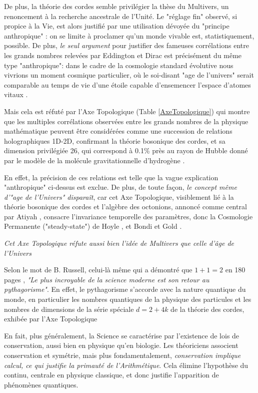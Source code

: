 \documentclass[a4paper,9pt]{article}
\begin{document}
De plus, la théorie des cordes semble privilégier la thèse du Multivers, un renoncement à la recherche ancestrale de l'Unité. Le "réglage fin" observé, si propice à la Vie, est alors justifié par une utilisation dévoyée du "principe anthropique" : on se limite à proclamer qu'un monde vivable est, statistiquement, possible. De plus, \textit{le seul argument} pour justifier des fameuses corrélations entre les grands nombres relevées par Eddington et Dirac \cite{Sanchez4} est précisément du même type "anthropique": dans le cadre de la cosmologie standard évolutive nous vivrions un moment cosmique particulier, où le soi-disant "age de l'univers" serait comparable au temps de vie d'une étoile capable d'ensemencer l'espace d'atomes vitaux \cite{Rees}.

Mais cela est réfuté par l'Axe Topologique (Table \ref{AxeTopologique}) qui montre que les multiples corrélations observées entre les grands nombres de la physique mathématique peuvent être considérées comme une succession de relations holographiques 1D-2D, confirmant la théorie bosonique des cordes, et sa dimension privilégiée 26, qui correspond à 0.1\% près au rayon de Hubble donné par le modèle de la molécule gravitationnelle d'hydrogène  \cite{Sanchez2}.


En effet, la précision de ces relations est telle que la vague explication "anthropique" ci-dessus est exclue. De plus, de toute façon, \textit{le concept même d'"age de l'Univers" disparaît}, car cet Axe Topologique, visiblement lié à la théorie bosonique des cordes et l'algèbre des octonions, annoncé comme central par Atiyah \cite{Atiyah}, consacre l'invariance temporelle des paramètres, donc la Cosmologie Permanente ("steady-state") de Hoyle \cite{Hoyle}, et Bondi et Gold \cite{Bondi2}.

\textit{Cet Axe Topologique réfute aussi bien l'idée de Multivers que celle d'âge de l'Univers}

Selon le mot de B. Russell, celui-là même qui a démontré que $1+1 = 2$ en 180 pages \cite{Russell}, \textit {"Le plus incroyable de la science moderne est son retour au pythagorisme"}\cite{Alcina}. En effet, le pythagorisme s’accorde avec la nature quantique du monde, en particulier les nombres quantiques de la physique des particules et les nombres de dimensions de la série spéciale $d = 2 + 4k$ de la théorie des cordes, exhibée par l'Axe Topologique 

En fait, plus généralement, la Science se caractérise par l'existence de lois de conservation, aussi bien en physique qu'en biologie. Les théoriciens associent conservation et symétrie, mais plus fondamentalement, \textit{conservation implique calcul, ce qui justifie la primauté de l'Arithmétique}. Cela élimine l'hypothèse du continu, centrale en physique classique, et donc justifie l'apparition de phénomènes quantiques.
 
\end{document}
